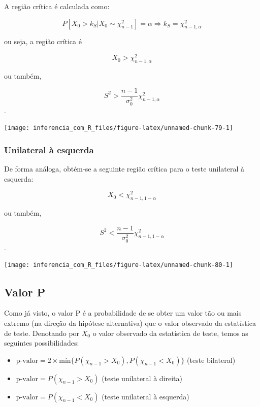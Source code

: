 \documentclass[
]{book}
\providecommand{\tightlist}{%
  \setlength{\itemsep}{0pt}\setlength{\parskip}{0pt}}
\begin{document}
A região crítica é calculada como:

\[P\left[X_0>k_S|X_0\sim\chi^2_{n-1}\right]=\alpha\Longrightarrow k_S=\chi^2_{n-1,\alpha}\]

ou seja, a região crítica é

\[X_0>\chi^2_{n-1,\alpha}\]

ou também,

\[S^2>\frac{n-1}{\sigma^2_0}\chi^2_{n-1,\alpha}\].

\begin{center}\texttt{[image: inferencia\_com\_R\_files/figure-latex/unnamed-chunk-79-1]} \end{center}

\hypertarget{unilateral-uxe0-esquerda-2}{%
\subsubsection{Unilateral à esquerda}\label{unilateral-uxe0-esquerda-2}}

De forma análoga, obtém-se a seguinte região crítica para o teste unilateral à esquerda:

\[X_0<\chi^2_{n-1,1-\alpha}\]

ou também,

\[S^2<\frac{n-1}{\sigma^2_0}\chi^2_{n-1,1-\alpha}\].

\begin{center}\texttt{[image: inferencia\_com\_R\_files/figure-latex/unnamed-chunk-80-1]} \end{center}

\hypertarget{valor-p}{%
\subsection{Valor P}\label{valor-p}}

Como já visto, o valor P é a probabilidade de se obter um valor tão ou mais extremo (na direção da hipótese alternativa) que o valor observado da estatística de teste. Denotando por \(X_0\) o valor observado da estatística de teste, temos as seguintes possibilidades:

\begin{itemize}
\tightlist
\item
  \(\text{p-valor}=2\times \text{mín}\{P(\chi_{n-1}>X_0),P(\chi_{n-1}<X_0)\}\) (teste bilateral)
\item
  \(\text{p-valor}= P(\chi_{n-1}>X_0)\) (teste unilateral à direita)
\item
  \(\text{p-valor}= P(\chi_{n-1}<X_0)\) (teste unilateral à esquerda)
\end{itemize}
\end{document}
